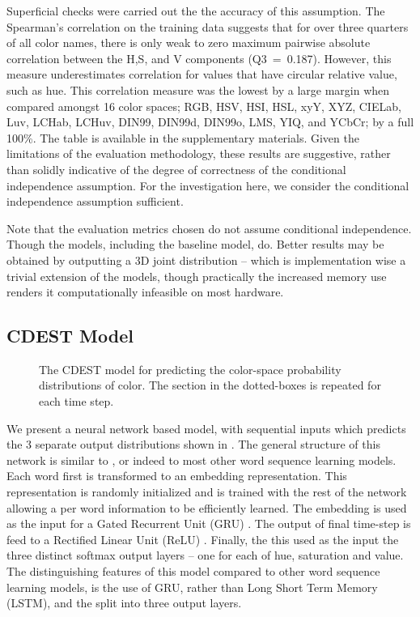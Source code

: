 \documentclass[11pt,letterpaper]{article}
\newcommand{\parencite}{\cite}
\newcommand{\textcite}{\newcite}
\begin{document}
Superficial checks were carried out the the accuracy of this assumption.
The Spearman's correlation on the training data suggests that for over three quarters of all color names, there is only weak to zero maximum pairwise absolute correlation between the H,S, and V components (\mbox{Q3 = 0.187}).
However, this measure underestimates correlation for values that have circular relative value, such as hue.
This correlation measure was the lowest by a large margin  when compared amongst 16 color spaces; RGB, HSV, HSI, HSL, xyY, XYZ, CIELab, Luv, LCHab, LCHuv, DIN99, DIN99d, DIN99o, LMS, YIQ, and YCbCr; by a full 100\%.
The table is available in the supplementary materials.
Given the limitations of the evaluation methodology, these results are suggestive, rather than solidly indicative of the degree of correctness of the conditional independence assumption.
For the investigation here, we consider the conditional independence assumption sufficient.

Note that the evaluation metrics chosen do not assume conditional independence.
Though the models, including the baseline model, do.
Better results may be obtained by outputting a 3D joint distribution -- which is implementation wise a trivial extension of the models, 
though practically the increased memory use renders it computationally infeasible on most hardware.


\subsection{CDEST Model}

\begin{figure}
	\resizebox{\columnwidth}{!}{}

	\caption{\label{network}
		The CDEST model for predicting the color-space probability distributions of color.
		The section in the dotted-boxes is repeated for each time step.
		}
\end{figure}

We present a neural network based model, with sequential inputs which predicts the 3 separate output distributions shown in . The general structure of this network is similar to \textcite{2016arXiv160603821M}, or indeed to most other word sequence learning models.
Each word first is transformed to an embedding representation.
This representation is randomly initialized and is trained with the rest of the network allowing a per word information to be efficiently learned.
The embedding is used as the input for a Gated Recurrent Unit (GRU)  \parencite{cho2014properties}.
The output of final time-step is feed to a Rectified Linear Unit (ReLU)  \parencite{dahl2013reludropout}.
Finally, the this used as the input the three distinct softmax output layers -- one for each of hue, saturation and value.
The distinguishing features of this model compared to other word sequence learning models, is the use of GRU, rather than Long Short Term Memory (LSTM), and the split into three output layers.
\end{document}
